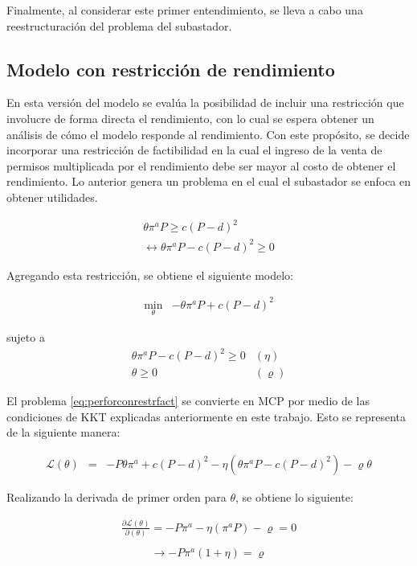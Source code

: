 Finalmente, al considerar este primer entendimiento, se lleva a cabo una reestructuración del problema del subastador.


\subsection{Modelo con restricción de rendimiento}\label{modelo:conrendimiento}

En esta versión del modelo se evalúa la posibilidad de incluir una restricción que involucre de forma directa el rendimiento, con lo cual se espera obtener un análisis de cómo el modelo responde al rendimiento. Con este propósito, se decide incorporar una restricción de factibilidad en la cual el ingreso de la venta de permisos multiplicada por el rendimiento debe ser mayor al costo de obtener el rendimiento. Lo anterior genera un problema en el cual el subastador se enfoca en obtener utilidades.

\begin{align}
\theta \pi^a P  \geq  c(P-d)^2 \\
\leftrightarrow \theta \pi^a P - c(P-d)^2 \geq 0  
\end{align}

\vspace{2.5mm}

Agregando esta restricción, se obtiene el siguiente modelo: 

\begin{eqnarray}
\min_{\theta} & -\theta \pi^aP + c(P-d)^2\label{eq:perforconrestrfact}
\end{eqnarray}

sujeto a
\begin{eqnarray}
    \theta \pi^a P - c(P-d)^2 \geq 0 & (\eta)  \label{perforconrestrfact:r1}\\
    \theta \geq 0 & (\varrho)
\end{eqnarray}

El problema \ref{eq:perforconrestrfact} se convierte en MCP por medio de las condiciones de KKT explicadas anteriormente en este trabajo. Esto se representa de la siguiente manera: 

\begin{eqnarray}
\mathcal{L}(\theta)&=&-P\theta\pi^a+c(P-d)^2 -\eta(\theta \pi^a P - c(P-d)^2)- \varrho\theta 
\end{eqnarray}


Realizando la derivada de primer orden para $\theta$, se obtiene lo siguiente:

\begin{equation}
\begin{array}{rrclcl}
    \frac{\partial\mathcal{L}(\theta)}{\partial (\theta)}=-P\pi^a-\eta(\pi^a P) -\varrho=0 \label{lag30}\\
\end{array}
\end{equation}
\begin{equation}
\begin{array}{rrclcl}
    \rightarrow -P\pi^a(1+\eta)=\varrho \label{lag31}\\
\end{array}
\end{equation}

